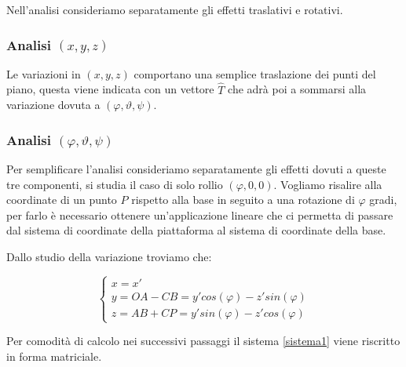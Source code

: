 \documentclass[11pt]{article}
\begin{document}
Nell'analisi consideriamo separatamente gli effetti traslativi e rotativi.

\subsubsection{Analisi $(x,y,z)$}\label{xyz}
Le variazioni in $(x,y,z)$ comportano una semplice traslazione dei punti del piano, questa viene indicata con un vettore $\hat T$ che adrà poi a sommarsi alla variazione dovuta a $(\varphi,\vartheta,\psi)$.

\subsubsection{Analisi $(\varphi,\vartheta,\psi)$}\label{ftp}
Per semplificare l'analisi consideriamo separatamente gli effetti dovuti a queste tre componenti, si studia il caso di solo rollio $(\varphi,0,0)$.
Vogliamo risalire alla coordinate di un punto $P$ rispetto alla base in seguito a una rotazione di $\varphi$ gradi, per farlo è necessario ottenere un'applicazione lineare che ci permetta di passare dal sistema di coordinate della piattaforma al sistema di coordinate della base.


Dallo studio della variazione troviamo che:

\begin{equation}\label{sistema1}
\begin{cases} 
x=x' \\ 
y=OA-CB=y'cos(\varphi)-z'sin(\varphi) \\ 
z=AB+CP=y'sin(\varphi)-z'cos(\varphi)
\end{cases} 
\end{equation}


Per comodità di calcolo nei successivi passaggi il sistema \eqref{sistema1} viene riscritto in forma matriciale.
\end{document}
